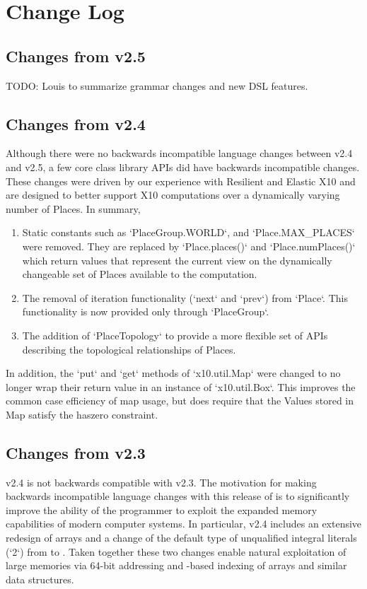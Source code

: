 \chapter{Change Log}

\section{Changes from \Xten{} v2.5}
TODO: Louis to summarize grammar changes and new DSL features.

\section{Changes from \Xten{} v2.4}
Although there were no backwards incompatible language changes between
\Xten{} v2.4 and \Xten{} v2.5, a few core class library APIs did 
have backwards incompatible changes.  These changes were driven by 
our experience with Resilient and Elastic X10 and are designed to
better support X10 computations over a dynamically varying number of
Places.  In summary,
\begin{enumerate}
\item Static constants such as \xcd`PlaceGroup.WORLD`,
    and \xcd`Place.MAX\_PLACES` were removed. They are replaced by
    \xcd`Place.places()` and \xcd`Place.numPlaces()` which return
    values that represent the current view on the dynamically
    changeable set of Places available to the computation.
\item The removal of iteration functionality (\xcd`next` and
  \xcd`prev`) from \xcd`Place`. This functionality is now provided
  only through \xcd`PlaceGroup`. 
\item The addition of \xcd`PlaceTopology` to provide a more flexible
  set of APIs describing the topological relationships of Places.
\end{enumerate}

In addition, the \xcd`put` and \xcd`get` methods of \xcd`x10.util.Map` 
were changed to no longer wrap their return value in an instance of
\xcd`x10.util.Box`. This improves the common case efficiency of map
usage, but does require that the Values stored in Map satisfy the
haszero constraint. 

\section{Changes from \Xten{} v2.3}
\Xten{} v2.4 is not backwards compatible with \Xten{} v2.3. The
motivation for making backwards incompatible language changes with
this release of \Xten{} is to significantly improve the ability of the
\Xten{} programmer to exploit the expanded memory capabilities of
modern computer systems.  In particular, \Xten{} v2.4 includes an
extensive redesign of arrays and a change of the default type of
unqualified integral literals (\eg \xcd`2`) from  to
. Taken together these two changes enable natural
exploitation of large memories via 64-bit addressing and
-based indexing of arrays and similar data structures. 

